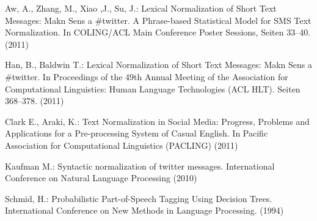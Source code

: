 \documentclass[citeauthoryear]{llncs}
\begin{document}

\begin{thebibliography}{}

 Aw, A., Zhang, M., Xiao ,J., Su, J.:
  Lexical Normalization of Short Text Messages: Makn Sens a
  \#{}twitter.
  A Phrase-based Statistical Model for {SMS} Text Normalization.
  In COLING/ACL Main Conference Poster Sessions,
  Seiten 33--40.
  (2011)

 Han, B., Baldwin T.:
  Lexical Normalization of Short Text Messages: Makn Sens a
  \#{}twitter.
  In Proceedings of the 49th Annual Meeting of the Association
  for Computational Linguistics: Human Language Technologies (ACL
  HLT). Seiten 368--378.
  (2011)

 Clark E., Araki, K.:
  Text Normalization in Social Media: Progress, Problems
  and Applications for a Pre-processing System of Casual
  English.
  In Pacific Association for Computational Linguistics
  (PACLING)
  (2011)

 Kaufman M.:
  Syntactic normalization of twitter messages.
  International Conference on Natural Language Processing
  (2010)

 Schmid, H.:
  Probabilistic Part-of-Speech Tagging Using Decision Trees.
  International Conference on New Methods in Language Processing.
  (1994)
\end{thebibliography}
\end{document}
